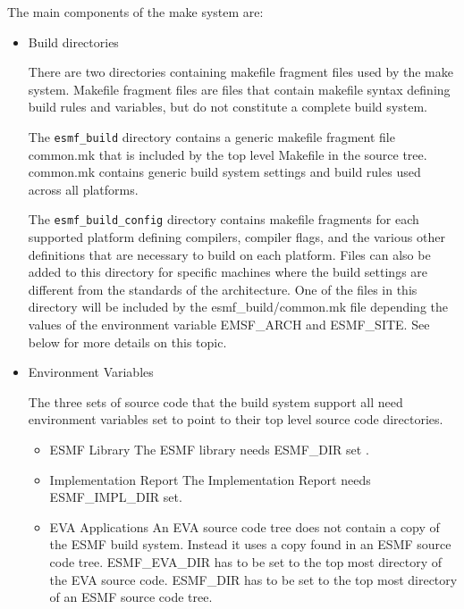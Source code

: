 The main components of the make system are:
\begin{itemize}
\item{Build directories}

There are two directories containing makefile fragment files used by
the make system.  Makefile fragment files are files that contain
makefile syntax defining build rules and variables, but do not
constitute a complete build system.

The {\tt esmf\_build} directory contains a generic makefile fragment
file common.mk that is included by the top level Makefile in the
source tree.  common.mk contains generic build system settings and
build rules used across all platforms.

The {\tt esmf\_build\_config} directory contains makefile fragments
for each supported platform defining compilers, compiler flags, and
the various other definitions that are necessary to build on each
platform.  Files can also be added to this directory for specific
machines where the build settings are different from the standards of
the architecture.  One of the files in this directory will be included
by the esmf\_build/common.mk file depending the values of the environment
variable EMSF\_ARCH and ESMF\_SITE.  See below for more details on this
topic.

\item{Environment Variables}

The three sets of source code that the build system support all need
environment variables set to point to their top level source code
directories. 

\begin{itemize}

\item{ESMF Library} The ESMF library needs ESMF\_DIR set .

\item{Implementation Report} The Implementation Report needs ESMF\_IMPL\_DIR set.  


\item{EVA Applications} An EVA source code tree does not contain a copy of the ESMF build
system.  Instead it uses a copy found in an ESMF source code tree.
ESMF\_EVA\_DIR has to be set to the top most directory of the EVA source
code.  ESMF\_DIR has to be set to the top most directory of an ESMF
source code tree.


\end{itemize}

\begin{description}


\end{description}
\end{itemize}
